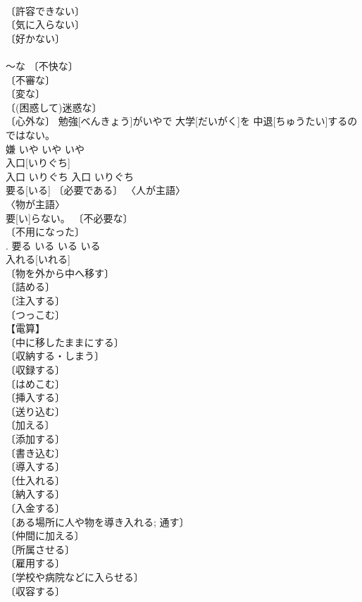 \documentclass[8pt]{extreport}
\begin{document}
\begin{CJK}{UTF8}{min}
\\	〔許容できない〕 
\\	〔気に入らない〕 
\\	〔好かない〕 
\\	[⇒いやでも, いやに] 
\\	～な 〔不快な〕 
\\	〔不審な〕 
\\	〔変な〕 
\\	〔(困惑して)迷惑な〕 
\\	〔心外な〕	勉強[べんきょう]がいやで 大学[だいがく]を 中退[ちゅうたい]するのではない。	
\\	嫌	いや	いや	いや	
\\	入口[いりぐち]	
\\	入口	いりぐち	入口	いりぐち	
\\	要る[いる]	〔必要である〕 〈人が主語〉 
\\	〈物が主語〉 
\\	要[い]らない。	〔不必要な〕 
\\	〔不用になった〕 
\\	[⇒いらぬ].	要る	いる	いる	いる	
\\	入れる[いれる]	
\\	〔物を外から中へ移す〕 
\\	〔詰める〕 
\\	〔注入する〕 
\\	〔つっこむ〕 
\\	【電算】 
\\	〔中に移したままにする〕 
\\	〔収納する・しまう〕 
\\	〔収録する〕 
\\	〔はめこむ〕 
\\	〔挿入する〕 
\\	〔送り込む〕 
\\	〔加える〕 
\\	〔添加する〕 
\\	〔書き込む〕 
\\	〔導入する〕 
\\	〔仕入れる〕 
\\	〔納入する〕 
\\	〔入金する〕 
\\	〔ある場所に人や物を導き入れる; 通す〕 
\\	〔仲間に加える〕 
\\	〔所属させる〕 
\\	〔雇用する〕 
\\	〔学校や病院などに入らせる〕 
\\	〔収容する〕 

\end{CJK}
\end{document}
